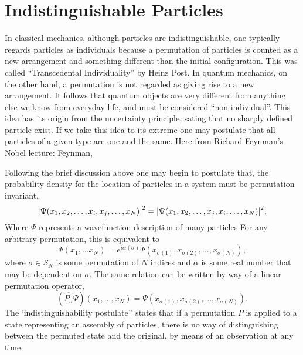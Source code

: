 \section{Indistinguishable Particles}

    In classical mechanics, although particles are indistinguishable, one typically
    regards particles as individuals because a permutation of particles is counted as
    a new arrangement and something different than the initial configuration. 
    This was called ``Transcedental
    Individuality'' by Heinz Post\cite{post1963individuality}. In quantum mechanics, on 
    the other hand, a permutation is not regarded as giving rise to a new 
    arrangement. It follows that quantum objects are very different from anything else we
    know from everyday life, and must be considered ``non-individual''. This 
    idea has its origin from the uncertainty principle, sating that no sharply defined 
    particle exist. If we take this idea
    to its extreme one may postulate that all particles of a given type are one and the
    same. Here from Richard Feynman's Nobel lecture:
    Feynman\cite{feynman1965nobel},

    Following the brief discussion above one may begin to postulate that, the probability density
    for the location of particles in a system must be permutation invariant,
    \begin{equation}
        \label{eq:square_wavefunction_pauli}
        \abs{\Psi(x_1, x_2, \dots, x_i, x_j, \dots, x_N)}^2 
        = 
        \abs{\Psi(x_1, x_2, \dots, x_j, x_i, \dots, x_N)}^2,
    \end{equation}
    Where $\Psi$ represents a wavefunction description of many particles 
    For any arbitrary permutation, this is equivalent to 
    \begin{equation}
        \Psi(x_1, \dots x_N) 
        =
        e^{i\alpha(\sigma)}\Psi(x_{\sigma(1)}, x_{\sigma(2)}, \dots, x_{\sigma(N)}),
    \end{equation}
    where $\sigma \in S_N$ is some permutation of $N$ indices and $\alpha$ is 
    some real number that may be dependent on $\sigma$.
    The same relation can be written by way of a linear permutation operator,
    \begin{equation}
        (\hat{P_\sigma}\Psi)(x_1, \dots, x_N)
        =
        \Psi(x_{\sigma(1)}, x_{\sigma(2)}, \dots, x_{\sigma(N)}).
    \end{equation}
    The `indistinguishability postulate'' states that if a permutation $P$ is applied 
    to a state representing an assembly of particles, there is no way of distinguishing
    between the permuted state and the original, by means of an observation at any time.

